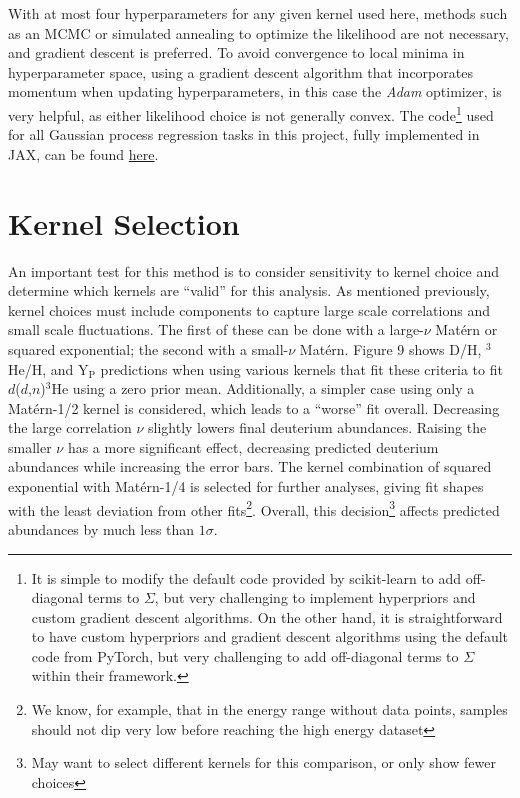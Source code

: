 \documentclass[%
 reprint,
superscriptaddress,
nofootinbib,
 amsmath,amssymb,
 aps,
 pra,
]{revtex4-2}
\begin{document}
With at most four hyperparameters for any given kernel used here, methods such as an MCMC or simulated annealing to optimize the likelihood are not necessary, and gradient descent is preferred. To avoid convergence to local minima in hyperparameter space, using a gradient descent algorithm that incorporates momentum when updating hyperparameters, in this case the \textit{Adam} optimizer, is very helpful, as either likelihood choice is not generally convex. The code\footnote{It is simple to modify the default code provided by scikit-learn to add off-diagonal terms to $\Sigma$, but very challenging to implement hyperpriors and custom gradient descent algorithms. On the other hand, it is straightforward to have custom hyperpriors and gradient descent algorithms using the default code from PyTorch, but very challenging to add off-diagonal terms to $\Sigma$ within their framework. \phantom{Some text to help with formatting.}} used for all Gaussian process regression tasks in this project, fully implemented in JAX, can be found \href{https://github.com/tim-launders/bbn_gaussian_processes}{here}.



\section{Kernel Selection}



An important test for this method is to consider sensitivity to kernel choice and determine which kernels are ``valid'' for this analysis. As mentioned previously, kernel choices must include components to capture large scale correlations and small scale fluctuations. The first of these can be done with a large-$\nu$ Mat\'ern or squared exponential; the second with a small-$\nu$ Mat\'ern. Figure 9 shows D/H, $^3$He/H, and Y$_\text{P}$ predictions when using various kernels that fit these criteria to fit $d$($d$,$n$)$^3$He using a zero prior mean. Additionally, a simpler case using only a Mat\'ern-1/2 kernel is considered, which leads to a ``worse'' fit overall. Decreasing the large correlation $\nu$ slightly lowers final deuterium abundances. Raising the smaller $\nu$ has a more significant effect, decreasing predicted deuterium abundances while increasing the error bars. The kernel combination of squared exponential with Mat\'ern-1/4 is selected for further analyses, giving fit shapes with the least deviation from other fits\footnote{We know, for example, that in the energy range without data points, samples should not dip very low before reaching the high energy dataset}. Overall, this decision\footnote{May want to select different kernels for this comparison, or only show fewer choices} affects predicted abundances by much less than $1\sigma$.
\end{document}
